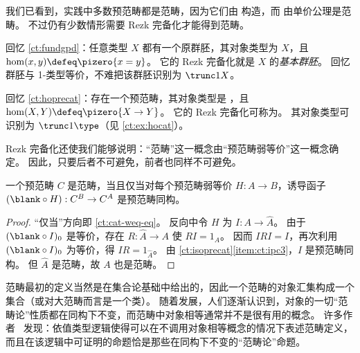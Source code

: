 我们已看到，实践中多数预范畴都是范畴，因为它们由 \uset 构造，而 \uset 由单价公理是范畴。
不过仍有少数情形需要 Rezk 完备化才能得到范畴。

\begin{eg}\label{ct:rezk-fundgpd-trunc1}
  回忆 \cref{ct:fundgpd}：任意类型 $X$ 都有一个原群胚，其对象类型为 $X$，且 $\hom(x,y) \defeq \pizero{x=y}$。
  它的 Rezk 完备化就是 $X$ 的\emph{基本群胚}。
  回忆群胚与 1-类型等价，不难把该群胚识别为 $\trunc1X$。
\end{eg}

\begin{eg}\label{ct:hocat}
  回忆 \cref{ct:hoprecat}：存在一个预范畴，其对象类型是 \type，且 $\hom(X,Y) \defeq \pizero{X\to Y}$。
  它的 Rezk 完备化可称为。
  其对象类型可识别为 $\trunc1\type$（见 \cref{ct:ex:hocat}）。
\end{eg}

Rezk 完备化还使我们能够说明：“范畴”这一概念由“预范畴弱等价”这一概念确定。
因此，只要后者不可避免，前者也同样不可避免。

\begin{thm}\label{ct:weq-iso-precat-cat}
  一个预范畴 $C$ 是范畴，当且仅当对每个预范畴弱等价 $H:A\to B$，诱导函子 $(\blank\circ H):C^B \to C^A$ 是预范畴同构。
\end{thm}
\begin{proof}
  “仅当”方向即 \cref{ct:cat-weq-eq}。
  反向中令 $H$ 为 $I:A\to\widehat A$。
  由于 $(\blank\circ I)_0$ 是等价，存在 $R:\widehat A\to A$ 使 $RI=1_A$。
  因而 $IRI=I$，再次利用 $(\blank\circ I)_0$ 为等价，得 $IR =1_{\widehat A}$。
  由 \cref{ct:isoprecat}\ref{item:ct:ipc3}，$I$ 是预范畴同构。
  但 $\widehat A$ 是范畴，故 $A$ 也是范畴。
\end{proof}

%


\newpage

\sectionNotes

范畴最初的定义当然是在集合论基础中给出的，因此一个范畴的对象汇集构成一个集合（或对大范畴而言是一个类）。
随着发展，人们逐渐认识到，对象的一切“范畴论”性质都在同构下不变，而范畴中对象相等通常并不是很有用的概念。
许多作者~\cite{blanc:eqv-log,freyd:invar-eqv,makkai:folds,makkai:comparing} 发现：依值类型逻辑使得可以在不调用对象相等概念的情况下表述范畴定义，而且在该逻辑中可证明的命题恰是那些在同构下不变的“范畴论”命题。
%

